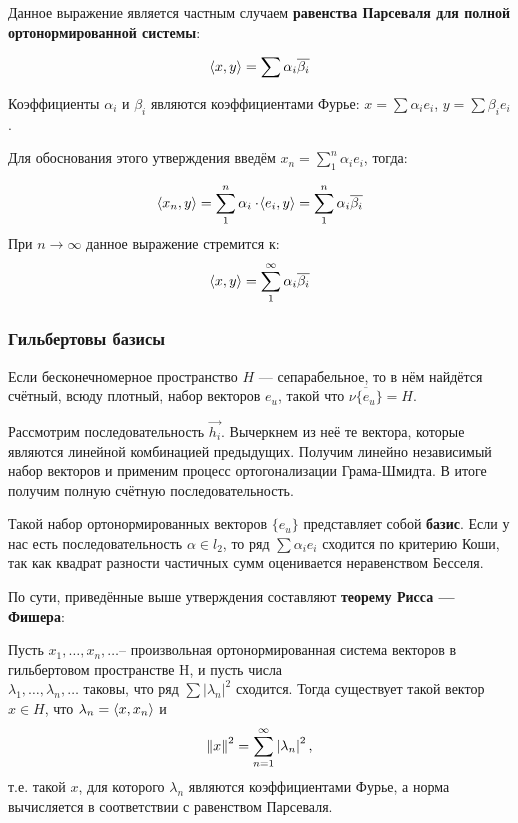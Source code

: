 \documentclass[12pt]{article}
\begin{document}
			Данное выражение является частным случаем \textbf{равенства Парсеваля для полной ортонормированной системы}:

			$$ \left\langle x, y \right\rangle = \sum \alpha_i \overline{\beta_i} $$

			Коэффициенты $\alpha_i$ и $\beta_i$ являются коэффициентами Фурье: $x = \sum \alpha_i e_i$, $y = \sum \beta_i e_i$.

			Для обоснования этого утверждения введём $x_n = \sum_1^n \alpha_i e_i$, тогда:

			$$ \left\langle x_n, y \right\rangle = \sum_1^n \alpha_i \cdot \! \left\langle e_i, y \right\rangle = \sum_1^n \alpha_i \overline{\beta_i}$$
			При $n \rightarrow \infty$ данное выражение стремится к:
			$$ \left\langle x, y \right\rangle = \sum_1^{\infty} \alpha_i \overline{\beta_i} $$

		\subsubsection{Гильбертовы базисы}

			Если бесконечномерное пространство $H$ --- сепарабельное, то в нём найдётся счётный, всюду плотный, набор векторов $e_u$, такой что $\overline{ \nu \{ e_u \} } = H$.

			Рассмотрим последовательность $\vec{h_i}$. Вычеркнем из неё те вектора, которые являются линейной комбинацией предыдущих.
			Получим линейно независимый набор векторов и применим процесс ортогонализации Грама-Шмидта. В итоге получим полную счётную 
			последовательность.

			Такой набор ортонормированных векторов $\{ e_u \}$ представляет собой \textbf{базис}. Если у нас
			есть последовательность $\alpha \in l_2$, то ряд $\sum \alpha_i e_i$ сходится по критерию Коши,
			так как квадрат разности частичных сумм оценивается неравенством Бесселя.

			По сути, приведённые выше утверждения составляют \textbf{теорему Рисса --- Фишера}:
			\begin{theorem}
				Пусть $x_1, \dots ,x_n, \dots $-- произвольная ортонормированная система векторов в гильбертовом пространстве H, и пусть 
				числа \\
				$\lambda _1, \dots ,\lambda _n, \dots $ таковы, что ряд $\sum |\lambda_n|^2$ сходится. Тогда существует такой 
				вектор $x\in H$, что $\lambda _n=\left\langle x, x_n \right\rangle$ и
				$$
					\left\| x \right\| ^2=\sum_{n=1}^{\infty } \left| \lambda_n \right|^2,
				$$
				т.е. такой $x$, для которого $\lambda_n$ являются коэффициентами Фурье, а норма вычисляется в 
				соответствии с равенством Парсеваля. 
			\end{theorem}
\end{document}
